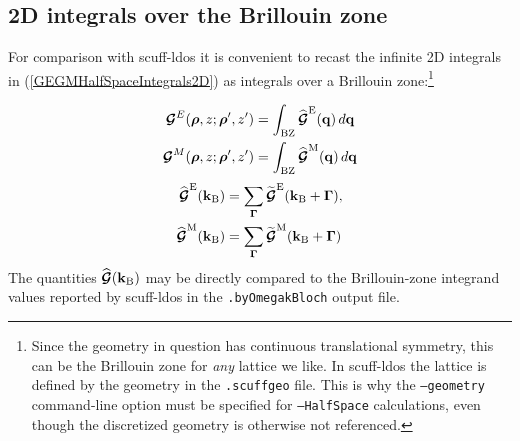 \documentclass[letterpaper]{article}
\begin{document}
\subsection{2D integrals over the Brillouin zone}

For comparison with {\sc scuff-ldos} it is convenient
to recast the infinite 2D integrals in (\ref{GEGMHalfSpaceIntegrals2D})
as integrals over a Brillouin zone:\footnote{Since the geometry
in question has continuous translational symmetry, this can be
the Brillouin zone for \textit{any} lattice we like. In 
{\sc scuff-ldos} the lattice is defined by the geometry 
in the \texttt{.scuffgeo} file. This is why the 
\texttt{--geometry} command-line option must be specified 
for \texttt{--HalfSpace} calculations, even though the 
discretized geometry is otherwise not referenced.}

\begin{subequations}
\begin{align}
\boldsymbol{\mathcal{G}}^{E}(\boldsymbol{\rho}, z; \boldsymbol{\rho}^\prime, z^\prime)
&=\int_{\text{\scriptsize BZ}} \widehat{\boldsymbol{\mathcal{G}}}^{\text{\scriptsize E}}(\mathbf{q}) \, d \mathbf{q}
\\
\boldsymbol{\mathcal{G}}^{M}(\boldsymbol{\rho}, z; \boldsymbol{\rho}^\prime, z^\prime)
&=\int_{\text{\scriptsize BZ}} \widehat{\boldsymbol{\mathcal{G}}}^{\text{\scriptsize M}}(\mathbf{q}) \, d \mathbf{q}
\end{align}
\label{GEGMHalfSpaceIntegralsBZ}
\end{subequations}
\begin{subequations}
\begin{align}
\widehat{\boldsymbol{\mathcal{G}}}^{\text{\scriptsize E}}(\mathbf{k}_{\text{\scriptsize B}})
&=\sum_{\boldsymbol{\Gamma}} \widetilde{\boldsymbol{\mathcal{G}}}^{\text{\scriptsize E}}(\mathbf{k}_{\text{\scriptsize B}} + \boldsymbol{\Gamma}), 
\\
\widehat{\boldsymbol{\mathcal{G}}}^{\text{\scriptsize M}}(\mathbf{k}_{\text{\scriptsize B}})
&=\sum_{\boldsymbol{\Gamma}} \widetilde{\boldsymbol{\mathcal{G}}}^{\text{\scriptsize M}}(\mathbf{k}_{\text{\scriptsize B}} + \boldsymbol{\Gamma})
\end{align}
\label{GEGMHalfSpaceIntegrandsBZ}%
\end{subequations}
The quantities $\widehat{\boldsymbol{\mathcal{G}}}(\mathbf{k}_{\text{\scriptsize B}})$ may be directly
compared to the Brillouin-zone integrand values reported
by {\sc scuff-ldos} in the \texttt{.byOmegakBloch} output file.

\end{document}
